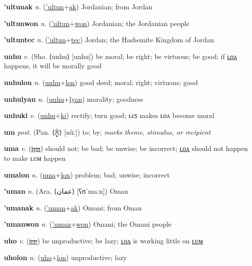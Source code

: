 \textbf{\hypertarget{'ultunak}{'ultunak}} \textit{n.} (\hyperlink{'ultun}{'ultun}+\allowbreak \hyperlink{ak}{ak})
Jordanian; from Jordan

\textbf{\hypertarget{'ultunwon}{'ultunwon}} \textit{n.} (\hyperlink{'ultun}{'ultun}+\allowbreak \hyperlink{won}{won})
Jordanian; the Jordanian people

\textbf{\hypertarget{'ultuntec}{'ultuntec}} \textit{n.} (\hyperlink{'ultun}{'ultun}+\allowbreak \hyperlink{tec}{tec})
Jordan; the Hashemite Kingdom of Jordan

\textbf{\hypertarget{unhu}{unhu}} \textit{v.} (Sho. ⟨unhu⟩ [unhu])
be moral; be right; be virtuous; be good; if \hyperlink{unhulon}{ʟᴏᴧ} happens, it will be morally good

\textbf{\hypertarget{unhulon}{unhulon}} \textit{n.} (\hyperlink{unhu}{unhu}+\allowbreak \hyperlink{lon}{lon})
good deed; moral; right; virtuous; good

\textbf{\hypertarget{unhulyan}{unhulyan}} \textit{n.} (\hyperlink{unhu}{unhu}+\allowbreak \hyperlink{lyan}{lyan})
morality; goodness

\textbf{\hypertarget{unhuki}{unhuki}} \textit{v.} (\hyperlink{unhu}{unhu}+\allowbreak \hyperlink{ki}{ki})
rectify; turn good; ʟєꜱ makes ʟᴏᴧ become moral

\textbf{\hypertarget{um}{um}} \textit{post.} (Pan. ⟨{\gurmukhi{}ਨੂੰ}⟩ [nũː])
to; by; \textit{marks theme, stimulus, or recipient}

\textbf{\hypertarget{uma}{uma}} \textit{v.} (\hyperlink{ipa}{\sout{ipa}})
should not; be bad; be unwise; be incorrect; \hyperlink{umalon}{ʟᴏᴧ} should not happen to make ʟᴜᴍ happen

\textbf{\hypertarget{umalon}{umalon}} \textit{n.} (\hyperlink{uma}{uma}+\allowbreak \hyperlink{lon}{lon})
problem; bad; unwise; incorrect

\textbf{\hypertarget{'uman}{'uman}} \textit{n.} (Ara. ⟨{\arabics{}عمان‎}⟩ [ʕʊˈmaːn])
Oman

\textbf{\hypertarget{'umanak}{'umanak}} \textit{n.} (\hyperlink{'uman}{'uman}+\allowbreak \hyperlink{ak}{ak})
Omani; from Oman

\textbf{\hypertarget{'umanwon}{'umanwon}} \textit{n.} (\hyperlink{'uman}{'uman}+\allowbreak \hyperlink{won}{won})
Omani; the Omani people

\textbf{\hypertarget{uho}{uho}} \textit{v.} (\hyperlink{ice}{\sout{ice}})
be unproductive; be lazy; \hyperlink{uholon}{ʟᴏᴧ} is working little on \hyperlink{uholum}{ʟᴜᴍ}

\textbf{\hypertarget{uholon}{uholon}} \textit{n.} (\hyperlink{uho}{uho}+\allowbreak \hyperlink{lon}{lon})
unproductive; lazy

